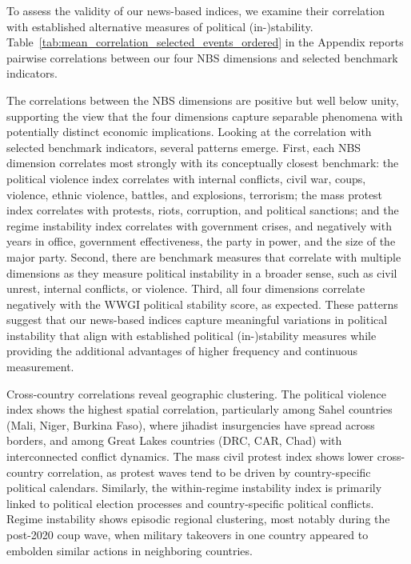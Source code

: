 \documentclass[12pt,a4paper,fleqn]{article}
\begin{document}
To assess the validity of our news-based indices, we examine their correlation with established alternative measures of political (in-)stability. Table~\ref{tab:mean_correlation_selected_events_ordered} in the Appendix reports pairwise correlations between our four NBS dimensions and selected benchmark indicators.

The correlations between the NBS dimensions are positive but well below unity, supporting the view that the four dimensions capture separable phenomena with potentially distinct economic implications. Looking at the correlation with selected benchmark indicators, several patterns emerge. First, each NBS dimension correlates most strongly with its conceptually closest benchmark: the political violence index correlates with internal conflicts, civil war, coups, violence, ethnic violence, battles, and explosions, terrorism; the mass protest index correlates with protests, riots, corruption, and political sanctions; and the regime instability index correlates with government crises, and negatively with years in office, government effectiveness, the party in power, and the size of the major party. Second, there are benchmark measures that correlate with multiple dimensions as they measure political instability in a broader sense, such as civil unrest, internal conflicts, or violence. Third, all four dimensions correlate negatively with the WWGI political stability score, as expected. These patterns suggest that our news-based indices capture meaningful variations in political instability that align with established political (in-)stability measures while providing the additional advantages of higher frequency and continuous measurement.

Cross-country correlations reveal geographic clustering. The political violence index shows the highest spatial correlation, particularly among Sahel countries (Mali, Niger, Burkina Faso), where jihadist insurgencies have spread across borders, and among Great Lakes countries (DRC, CAR, Chad) with interconnected conflict dynamics. The mass civil protest index shows lower cross-country correlation, as protest waves tend to be driven by country-specific political calendars. Similarly, the within-regime instability index is primarily linked to political election processes and country-specific political conflicts. Regime instability shows episodic regional clustering, most notably during the post-2020 coup wave, when military takeovers in one country appeared to embolden similar actions in neighboring countries. 
\end{document}
